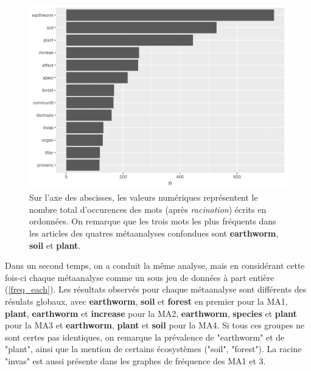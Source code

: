 \documentclass{book}
\begin{document}
\begin{figure}[htb] %
    \begin{center} %
        \includegraphics[width=1\textwidth]{freq_all_MA.png}
        \caption{Sur l'axe des abscisses, les valeurs numériques représentent le nombre total d'occurences des mots (après \textit{racination}) écrits en ordonnées. On remarque que les trois mots les plus fréquents dans les articles des quatres métaanalyses confondues sont \textbf{earthworm}, \textbf{soil} et \textbf{plant}.\label{freq_all}}
    \end{center}  
\end{figure}

\newpage
Dans un second temps, on a conduit la même analyse, mais en considérant cette fois-ci chaque métaanalyse comme un sous jeu de données à part entière (\cref{freq_each}). Les résultats observés pour chaque métaanalyse sont différents des résulats globaux, avec \textbf{earthworm}, \textbf{soil} et \textbf{forest} en premier pour la MA1, \textbf{plant}, \textbf{earthworm} et \textbf{increase} pour la MA2, \textbf{earthworm}, \textbf{species} et \textbf{plant} pour la MA3 et \textbf{earthworm}, \textbf{plant} et \textbf{soil} pour la MA4. Si tous ces groupes ne sont certes pas identiques, on remarque la prévalence de "earthworm" et de "plant", ainsi que la mention de certains écosystèmes ("soil", "forest"). La racine "invas" est aussi présente dans les graphes de fréquence des MA1 et 3.

\end{document}
